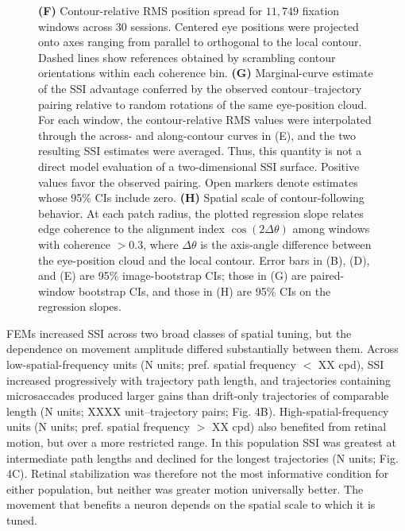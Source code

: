 \documentclass{lite}
\begin{document}
\begin{figure}[p]
{    \textbf{(F)} Contour-relative RMS position spread for $11{,}749$ fixation windows across 30 sessions. Centered eye positions were projected onto axes ranging from parallel to orthogonal to the local contour. Dashed lines show references obtained by scrambling contour orientations within each coherence bin.
    \textbf{(G)} Marginal-curve estimate of the SSI advantage conferred by the observed contour--trajectory pairing relative to random rotations of the same eye-position cloud. For each window, the contour-relative RMS values were interpolated through the across- and along-contour curves in (E), and the two resulting SSI estimates were averaged. Thus, this quantity is not a direct model evaluation of a two-dimensional SSI surface. Positive values favor the observed pairing. Open markers denote estimates whose 95\% CIs include zero.
    \textbf{(H)} Spatial scale of contour-following behavior. At each patch radius, the plotted regression slope relates edge coherence to the alignment index $\cos(2\Delta\theta)$ among windows with coherence $>0.3$, where $\Delta\theta$ is the axis-angle difference between the eye-position cloud and the local contour. Error bars in (B), (D), and (E) are 95\% image-bootstrap CIs; those in (G) are paired-window bootstrap CIs, and those in (H) are 95\% CIs on the regression slopes.
  }
  \label{fig:ssi}
\end{figure}



FEMs increased SSI across two broad classes of spatial tuning, but the dependence on movement amplitude differed substantially between them. Across low-spatial-frequency units (N units; pref. spatial frequency $<$ XX cpd), SSI increased progressively with trajectory path length, and trajectories containing microsaccades produced larger gains than drift-only trajectories of comparable length (N units;  XXXX unit–trajectory pairs; Fig. 4B). High-spatial-frequency units (N units; pref. spatial frequency $>$ XX cpd) also benefited from retinal motion, but over a more restricted range. In this population SSI was greatest at intermediate path lengths and declined for the longest trajectories (N units; Fig. 4C). Retinal stabilization was therefore not the most informative condition for either population, but neither was greater motion universally better. The movement that benefits a neuron depends on the spatial scale to which it is tuned.
\end{document}

